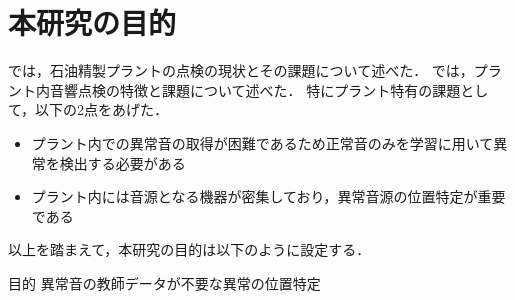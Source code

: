 \documentclass[../main]{subfiles}
\begin{document}
\section{本研究の目的}
\label{sec:intro_my_purpose}
では，石油精製プラントの点検の現状とその課題について述べた．
では，プラント内音響点検の特徴と課題について述べた．
特にプラント特有の課題として，以下の2点をあげた．

\begin{itemize}
  \item プラント内での異常音の取得が困難であるため正常音のみを学習に用いて異常を検出する必要がある
  \item プラント内には音源となる機器が密集しており，異常音源の位置特定が重要である
\end{itemize}
以上を踏まえて，本研究の目的は以下のように設定する．

\bigskip
\begin{itembox}[c]{目的}
  \centering
  異常音の教師データが不要な異常の位置特定
\end{itembox}
\end{document}
